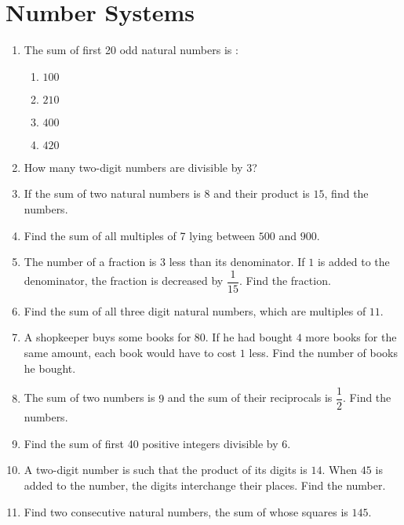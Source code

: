 \documentclass[journal,12pt,onecolumn]{IEEEtran}
\theoremstyle{remark}
\begin{document}
\section{Number Systems}
\begin{enumerate}
\item The sum of first 20 odd natural numbers is : 
\begin{enumerate}
\item $100$ 
\item $210$ 
\item $400$ 
\item $420$ 
\end{enumerate}
\item How many two-digit numbers are divisible by 3? 
\item If the sum of two natural numbers is $8$ and their product is $15$, find the numbers. 
\item Find the sum of all multiples of 7 lying between $500$ and $900$. 
\item The number of a fraction is $3$ less than its denominator. If $1$ is added to the denominator, the fraction is decreased by $\dfrac{1}{15}$. Find the fraction. 

\item Find the sum of all three digit natural numbers, which are multiples of $11$. 
\item A shopkeeper buys some books for \rupee $80$. If he had bought $4$ more books for the same amount, each book would have to cost \rupee $1$ less. Find the number of books he bought. 

\item The sum of two numbers is $9$ and the sum of their reciprocals is $\dfrac{1}{2}$. Find the numbers. 
\item Find the sum of first 40 positive integers divisible by $6$. 
\item A two-digit number is such that the product of its digits is $14$. When $45$ is added to the number, the digits interchange their places. Find the number. 
\item Find two consecutive natural numbers, the sum of whose squares is $145$. 
\end{enumerate}
\end{document}
